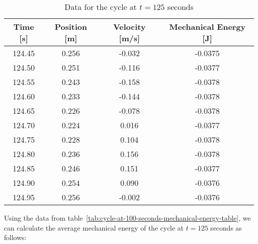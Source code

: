 \documentclass{article}
\begin{document}
            \begin{table}[H]
                \centering
                \begin{tabular}{|c|c|c|c|}
                    \hline
                    Time [s] & Position [m] & Velocity [m/s] & Mechanical Energy [J] \\
                    \hline
                    124.45   & 0.256        & -0.032         & -0.0375               \\
                    \hline
                    124.50   & 0.251        & -0.116         & -0.0377               \\
                    \hline
                    124.55   & 0.243        & -0.158         & -0.0378               \\
                    \hline
                    124.60   & 0.233        & -0.144         & -0.0378               \\
                    \hline
                    124.65   & 0.226        & -0.078         & -0.0378               \\
                    \hline
                    124.70   & 0.224        & 0.016          & -0.0377               \\
                    \hline
                    124.75   & 0.228        & 0.104          & -0.0378               \\
                    \hline
                    124.80   & 0.236        & 0.156          & -0.0378               \\
                    \hline
                    124.85   & 0.246        & 0.151          & -0.0377               \\
                    \hline
                    124.90   & 0.254        & 0.090          & -0.0376               \\
                    \hline
                    124.95   & 0.256        & -0.002         & -0.0376               \\
                    \hline
                \end{tabular} %
                \caption{Data for the cycle at $t=125$ seconds}\label{tab:cycle-at-125-seconds-mechanical-energy-table}
            
            \end{table}
            
            Using the data from table~\ref{tab:cycle-at-100-seconds-mechanical-energy-table}, we can calculate the average mechanical energy of the cycle at $t=125$ seconds as follows:
            
\end{document}
